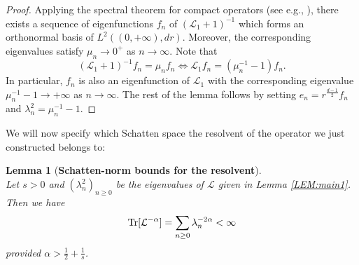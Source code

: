 \documentclass[%
11pt,  reqno]{amsart}
\newtheorem{lemma}[theorem]{Lemma}
\theoremstyle{remarkstyle}
\newcommand{\1}{\hspace{0.2mm}\text{I}\hspace{0.2mm}}
\newcommand{\noi}{\noindent}
\renewcommand{\L}{\mathcal{L}}
\newcommand{\al}{\alpha}
\newcommand{\ld}{\lambda}
\numberwithin{equation}{section}
\numberwithin{theorem}{section}
\begin{document}
\begin{proof}
		Applying the spectral theorem for compact operators (see e.g., \cite[Theorem XIII.64]{RS78}), there exists a sequence of eigenfunctions $f_n$ of $(\L_1+1)^{-1}$ which forms an orthonormal basis of $L^2((0,+\infty),dr)$. Moreover, the corresponding eigenvalues satisfy $\mu_n \to 0^+$ as $n\to \infty$. Note that 
		\[
		(\L_1+1)^{-1} f_n = \mu_n f_n \Leftrightarrow \L_1 f_n = (\mu_n^{-1}-1) f_n.
		\]
		In particular, $f_n$ is also an eigenfunction of $\L_1$ with the corresponding eigenvalue $\mu_n^{-1}-1\to +\infty$ as $n\to \infty$.  The rest of the lemma follows by setting $e_n = r^{\frac{d-1}{2}} f_n$ and $\ld_n^2 = \mu_n^{-1}-1$.
	\end{proof}
	
	
	We will now specify which Schatten space the resolvent of the operator we just constructed belongs to:
	
	\begin{lemma}[\textbf{Schatten-norm bounds for the resolvent}]\label{LEM:main2}\mbox{}\\
		Let $s>0$ and $(\ld_n^2)_{n\ge 0}$ be the eigenvalues of $\L$ given in Lemma \ref{LEM:main1}. Then we have
		\begin{align}
			\label{traceEst}
			{\rm Tr} [\L^{-\al}] = \sum_{n\ge 0} \ld_n^{-2\al} < \infty
		\end{align}
		\noi 
		provided $\al > \frac12 + \frac1s$.
	\end{lemma}
	
\end{document}
